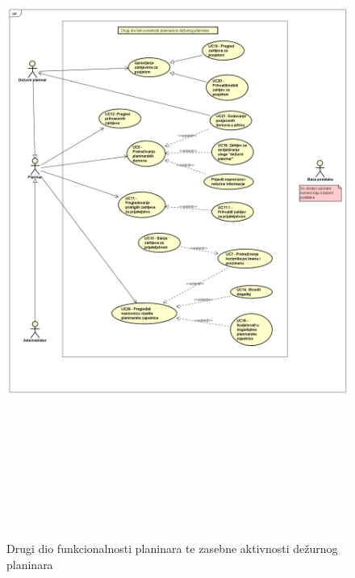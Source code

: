 			\begin{figure}[H]
				\includegraphics[scale=1, width = 165mm, height=220mm]{dijagrami/planinar2.png} %
				\centering
				\caption{Drugi dio funkcionalnosti planinara te zasebne aktivnosti dežurnog planinara}
				\label{fig:UC dijagrami}
			\end{figure}

